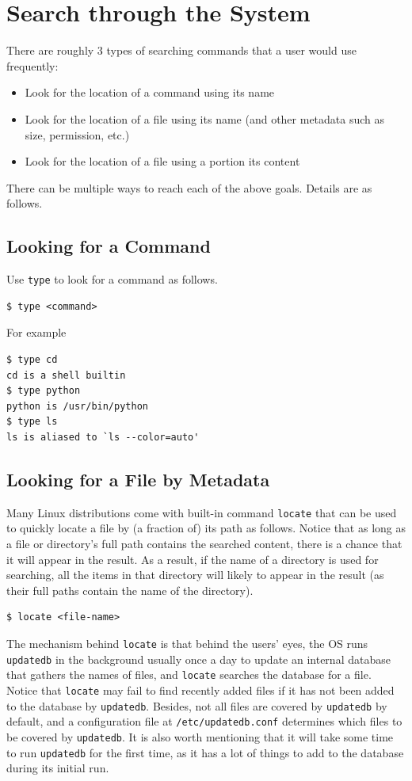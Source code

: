 \section{Search through the System}

There are roughly 3 types of searching commands that a user would use frequently:
\begin{itemize}
  \item Look for the location of a command using its name
  \item Look for the location of a file using its name (and other metadata such as size, permission, etc.)
  \item Look for the location of a file using a portion its content
\end{itemize}

There can be multiple ways to reach each of the above goals. Details are as follows.

\subsection{Looking for a Command}

Use \verb|type| to look for a command as follows.
\begin{lstlisting}
$ type <command>
\end{lstlisting}

For example
\begin{lstlisting}
$ type cd
cd is a shell builtin
$ type python
python is /usr/bin/python
$ type ls
ls is aliased to `ls --color=auto'
\end{lstlisting}

\subsection{Looking for a File by Metadata}

Many Linux distributions come with built-in command \verb|locate| that can be used to quickly locate a file by (a fraction of) its path as follows. Notice that as long as a file or directory's full path contains the searched content, there is a chance that it will appear in the result. As a result, if the name of a directory is used for searching, all the items in that directory will likely to appear in the result (as their full paths contain the name of the directory).
\begin{lstlisting}
$ locate <file-name>
\end{lstlisting}

The mechanism behind \verb|locate| is that behind the users' eyes, the OS runs \verb|updatedb| in the background usually once a day to update an internal database that gathers the names of files, and \verb|locate| searches the database for a file. Notice that \verb|locate| may fail to find recently added files if it has not been added to the database by \verb|updatedb|. Besides, not all files are covered by \verb|updatedb| by default, and a configuration file at \verb|/etc/updatedb.conf| determines which files to be covered by \verb|updatedb|. It is also worth mentioning that it will take some time to run \verb|updatedb| for the first time, as it has a lot of things to add to the database during its initial run.

